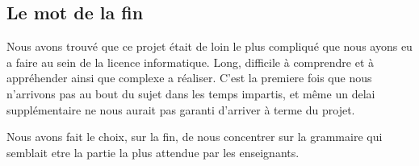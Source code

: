 \documentclass[12pt]{article}
\begin{document}
\subsection{Le mot de la fin}
Nous avons trouvé que ce projet était de loin le plus compliqué que nous ayons eu a
faire au sein de la licence informatique. Long, difficile à comprendre et
à appréhender ainsi que complexe a réaliser. C'est la premiere fois
que nous n'arrivons pas au bout du sujet dans les temps impartis, et même un
delai supplémentaire ne nous aurait pas garanti d'arriver à terme du projet.
\newline
\newline

Nous avons fait le choix, sur la fin, de nous concentrer sur la grammaire
qui semblait etre la partie la plus attendue par les enseignants.
\newline
\end{document}
